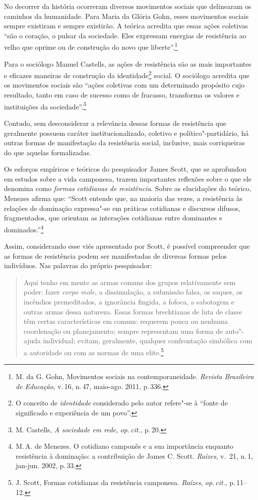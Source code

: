 No decorrer da história ocorreram diversos movimentos sociais que
delinearam os caminhos da humanidade. Para Maria da Glória Gohn,
esses movimentos sociais sempre existiram e sempre existirão. A teórica
acredita que essas ações coletivas ``são o coração, o pulsar da
sociedade. Eles expressam energias de resistência ao velho que oprime ou
de construção do novo que liberte''.\footnote{M. da G. Gohn, Movimentos sociais na contemporaneidade. \textit{Revista Brasileira de Educação}, v.\,16, n.\,47, maio-ago. 2011, p.\,336.}

Para o sociólogo Manuel Castells, as ações de resistência são as
mais importantes e eficazes maneiras de construção da
identidade\footnote{O conceito de \textit{identidade} considerado pelo autor
  refere"-se à ``fonte de significado e experiência de um povo''.} social.
O sociólogo acredita que os movimentos sociais são ``ações coletivas com
um determinado propósito cujo resultado, tanto em caso de sucesso como
de fracasso, transforma os valores e instituições da sociedade''.\footnote{M. Castells, \textit{A sociedade em rede}, \textit{op.\,cit.}, p.\,20.}

Contudo, sem desconsiderar a relevância dessas formas de resistência que
geralmente possuem caráter institucionalizado, coletivo e
político"-partidário, há outras formas de manifestação da resistência
social, inclusive, mais corriqueiras do que aquelas formalizadas.

Os esforços empíricos e teóricos do pesquisador James Scott, que se
aprofundou em estudos sobre a vida camponesa, trazem importantes
reflexões sobre o que ele denomina como \textit{formas cotidianas de
resistência}. Sobre as elucidações do teórico, Menezes
afirma que: ``Scott entende que, na maioria das vezes, a resistência às
relações de dominação expressa"-se em práticas cotidianas e discursos
difusos, fragmentados, que orientam as interações cotidianas entre
dominantes e dominados.''\footnote{M.\,A. de Menezes. O cotidiano camponês e a sua importância enquanto resistência à dominação: a contribuição de James C. Scott.
\textit{Raízes}, v.\, 21, n.\,1, jan-jun. 2002, p.\,33.}

Assim, considerando esse viés apresentado por Scott, é possível
compreender que as formas de resistência podem ser manifestadas de
diversas formas pelos indivíduos. Nas palavras do próprio pesquisador:

\begin{quote}
Aqui tenho em mente as armas comuns dos grupos relativamente sem poder:
fazer \textit{corpo mole}, a dissimulação, a submissão falsa, os saques, os
incêndios premeditados, a ignorância fingida, a fofoca, a sabotagem e
outras armas dessa natureza. Essas formas brechtianas de luta de classe
têm certas características em comum: requerem pouca ou nenhuma
coordenação ou planejamento; sempre representam uma forma de auto"-ajuda
individual; evitam, geralmente, qualquer confrontação simbólica com a
autoridade ou com as normas de uma elite.\footnote{J. Scott, Formas cotidianas da resistência camponesa. \textit{Raízes}, \textit{op.\,cit.}, p.\,11--12.}
\end{quote}

